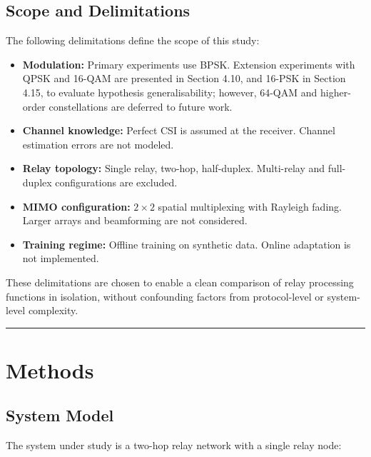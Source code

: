 \documentclass[
  english,
  12pt,
  12pt,
  a4paper,
  oneside]{report}
\providecommand{\tightlist}{%
  \setlength{\itemsep}{0pt}\setlength{\parskip}{0pt}}
\begin{document}
\section{Scope and Delimitations}\label{sec:scope-and-delimitations}

The following delimitations define the scope of this study:

\begin{itemize}
\tightlist
\item
  \textbf{Modulation:} Primary experiments use BPSK. Extension experiments with QPSK and 16-QAM are presented in Section 4.10, and 16-PSK in Section 4.15, to evaluate hypothesis generalisability; however, 64-QAM and higher-order constellations are deferred to future work.
\item
  \textbf{Channel knowledge:} Perfect CSI is assumed at the receiver. Channel estimation errors are not modeled.
\item
  \textbf{Relay topology:} Single relay, two-hop, half-duplex. Multi-relay and full-duplex configurations are excluded.
\item
  \textbf{MIMO configuration:} \(2 \times 2\) spatial multiplexing with Rayleigh fading. Larger arrays and beamforming are not considered.
\item
  \textbf{Training regime:} Offline training on synthetic data. Online adaptation is not implemented.
\end{itemize}

These delimitations are chosen to enable a clean comparison of relay processing functions in isolation, without confounding factors from protocol-level or system-level complexity.

\begin{center}\rule{0.5\linewidth}{0.5pt}\end{center}

\chapter{Methods}\label{sec:methods}

\section{System Model}\label{sec:system-model-1}

The system under study is a two-hop relay network with a single relay node:
\end{document}
